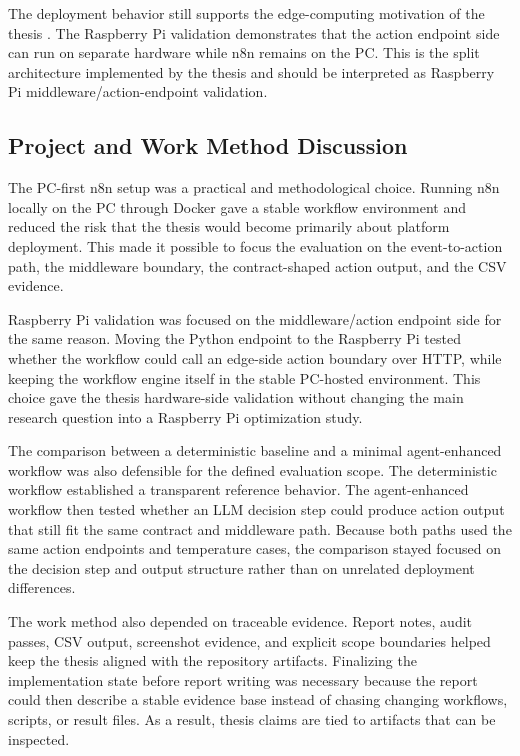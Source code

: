 The deployment behavior still supports the edge-computing motivation of the thesis \cite{edgeComputingSatyanarayanan,iotSurveyAtzori}. The Raspberry Pi validation demonstrates that the action endpoint side can run on separate hardware while n8n remains on the PC. This is the split architecture implemented by the thesis and should be interpreted as Raspberry Pi middleware/action-endpoint validation.

\subsection{Project and Work Method Discussion}\label{subsec:discussion-project-work-method}

The PC-first n8n setup was a practical and methodological choice. Running n8n locally on the PC through Docker gave a stable workflow environment and reduced the risk that the thesis would become primarily about platform deployment. This made it possible to focus the evaluation on the event-to-action path, the middleware boundary, the contract-shaped action output, and the CSV evidence.

Raspberry Pi validation was focused on the middleware/action endpoint side for the same reason. Moving the Python endpoint to the Raspberry Pi tested whether the workflow could call an edge-side action boundary over HTTP, while keeping the workflow engine itself in the stable PC-hosted environment. This choice gave the thesis hardware-side validation without changing the main research question into a Raspberry Pi optimization study.

The comparison between a deterministic baseline and a minimal agent-enhanced workflow was also defensible for the defined evaluation scope. The deterministic workflow established a transparent reference behavior. The agent-enhanced workflow then tested whether an LLM decision step could produce action output that still fit the same contract and middleware path. Because both paths used the same action endpoints and temperature cases, the comparison stayed focused on the decision step and output structure rather than on unrelated deployment differences.

The work method also depended on traceable evidence. Report notes, audit passes, CSV output, screenshot evidence, and explicit scope boundaries helped keep the thesis aligned with the repository artifacts. Finalizing the implementation state before report writing was necessary because the report could then describe a stable evidence base instead of chasing changing workflows, scripts, or result files. As a result, thesis claims are tied to artifacts that can be inspected.


